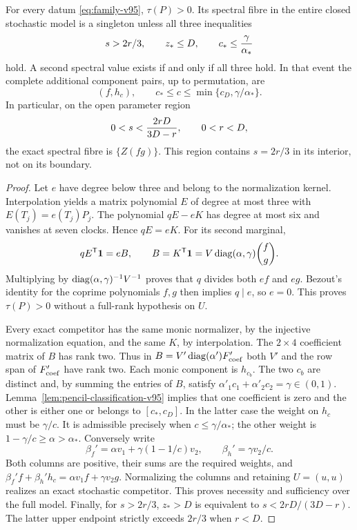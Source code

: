 \begin{theorem}\label{thm:cubic-classification-v95}
For every datum \eqref{eq:family-v95}, $\tau(P)>0$. Its spectral fibre
in the entire closed stochastic model is a singleton unless all three inequalities
\begin{equation}\label{eq:nonidentification-criterion-v95}
 s>2r/3,\qquad z_*\le D,\qquad c_*\le {\gamma\over\alpha_*}
\end{equation}
hold. A second spectral value exists if and only if all three hold. In that event the complete additional component pairs, up to
permutation, are
\[
 (f,h_c),\qquad c_*\le c\le\min\{c_D,\gamma/\alpha_*\}.
\]
In particular, on the open parameter region
\begin{equation}\label{eq:stable-region-v95}
 0<s<{2rD\over3D-r},\qquad 0<r<D,
\end{equation}
the exact spectral fibre is $\{Z(fg)\}$. This region contains
$s=2r/3$ in its interior, not on its boundary.
\end{theorem}
\begin{proof}
Let $e$ have degree below three and belong to the normalization kernel.
Interpolation yields a matrix polynomial $E$ of degree at most three
with $E(T_j)=e(T_j)P_j$. The polynomial $qE-eK$ has degree at most six
and vanishes at seven clocks. Hence $qE=eK$. For its second marginal,
\[
 q E^{\mathsf T}\mathbf 1=e B,\qquad
 B=K^{\mathsf T}\mathbf 1=V\operatorname{diag}(\alpha,\gamma)\binom f g.
\]
Multiplying by $\operatorname{diag}(\alpha,\gamma)^{-1}V^{-1}$ proves that $q$
divides both $ef$ and $eg$. Bezout's identity for the coprime polynomials
$f,g$ then implies $q\mid e$, so $e=0$. This proves $\tau(P)>0$
without a full-rank hypothesis on $U$.

Every exact competitor has the same monic normalizer, by the injective
normalization equation, and the same $K$, by interpolation. The
$2\times4$ coefficient matrix of $B$ has rank two. Thus in
$B=V'\operatorname{diag}(\alpha')F'_{\rm coef}$ both $V'$ and the row span of
$F'_{\rm coef}$ have rank two. Each monic component is $h_{c_b}$.
The two $c_b$ are distinct and, by summing the entries of $B$, satisfy
$\alpha'_1c_1+\alpha'_2c_2=\gamma\in(0,1)$.
Lemma~\ref{lem:pencil-classification-v95} implies that one coefficient
is zero and the other is either one or belongs to $[c_*,c_D]$.
In the latter case the weight on $h_c$ must be $\gamma/c$. It is
admissible precisely when $c\le\gamma/\alpha_*$; the other weight is
$1-\gamma/c\ge\alpha>\alpha_*$. Conversely write
\[
 \beta_f'=\alpha v_1+\gamma(1-1/c)v_2,\qquad
 \beta_h'=\gamma v_2/c.
\]
Both columns are positive, their sums are the required weights, and
$\beta_f'f+\beta_h'h_c=\alpha v_1f+\gamma v_2g$. Normalizing the
columns and retaining $U=(u,u)$ realizes an exact stochastic competitor.
This proves necessity and sufficiency over the full model. Finally,
for $s>2r/3$, $z_*>D$ is equivalent to
$s<2rD/(3D-r)$. The latter upper endpoint strictly exceeds $2r/3$
when $r<D$.
\end{proof}

